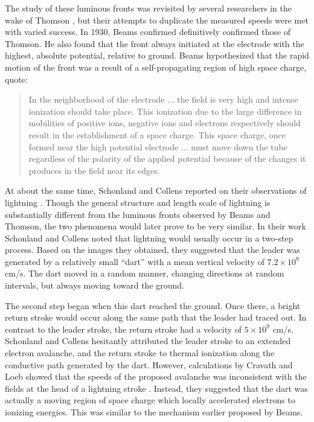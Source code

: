 The study of these luminous fronts was revisited by several researchers in the
wake of Thomson \cite{James1904, Whiddington1925, Beams1926}, but their attempts
to duplicate the measured speeds were met with varied success. In 1930, Beams
confirmed definitively confirmed those of Thomson. He also found that the front
always initiated at the electrode with the highest, absolute potential, relative
to ground. Beams hypothesized that the rapid motion of the front was a result of
a self-propagating region of high space charge, quote:
\begin{quote}
  In the neighborhood of the electrode $\ldots$ the field is very high and
  intense ionization should take place. This ionization due to the large
  difference in mobilities of positive ions, negative ions and electrons
  respectively should result in the establishment of a space charge. This space
  charge, once formed near the high potential electrode $\ldots$ must move
  down the tube regardless of the polarity of the applied potential because of
  the changes it produces in the field near its edges.
\end{quote}

At about the same time, Schonland and Collens reported on their observations of
lightning \cite{Schonland1933}. Though the general structure and length scale of
lightning is substantially different from the luminous fronts observed by Beams
and Thomson, the two phenomena would later prove to be very similar. In their
work Schonland and Collens noted that lightning would usually occur in a
two-step process. Based on the images they obtained, they suggested that
the leader was generated by a relatively small ``dart'' with a mean vertical
velocity of $7.2\times10^8$ cm/s. The dart moved in a random manner, changing
directions at random intervals, but always moving toward the ground.

The second step began when this dart reached the ground. Once there, a bright
return stroke would occur along the same path that the leader had traced out. In
contrast to the leader stroke, the return stroke had a velocity of $5\times10^9$
cm/s. Schonland and Collens hesitantly attributed the leader stroke to an
extended electron avalanche, and the return stroke to thermal ionization along
the conductive path generated by the dart. However, calculations by Cravath and
Loeb showed that the speeds of the proposed avalanche was inconsistent with the
fields at the head of a lightning stroke \cite{Cravath1935}. Instead, they
suggested that the dart was actually a moving region of space charge which
locally accelerated electrons to ionizing energies. This was similar to the
mechanism earlier proposed by Beams.

